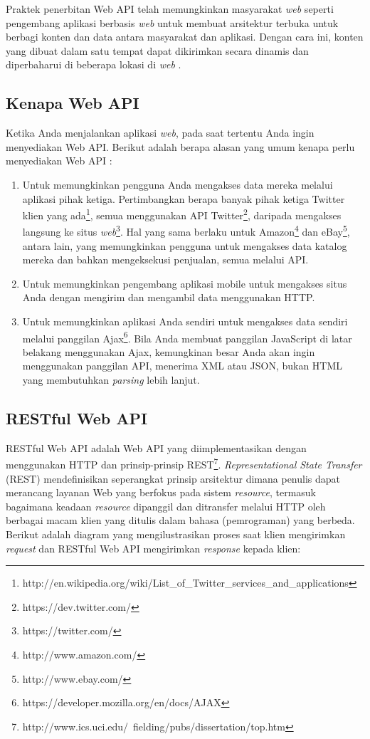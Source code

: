 \documentclass[a4paper, 12pt]{report}
\begin{document}
\onehalfspacing Praktek penerbitan Web API telah memungkinkan masyarakat \textit{web} seperti pengembang aplikasi berbasis \textit{web} untuk membuat arsitektur terbuka untuk berbagi konten dan data antara masyarakat dan aplikasi. Dengan cara ini, konten yang dibuat dalam satu tempat dapat dikirimkan secara dinamis dan diperbaharui di beberapa lokasi di \textit{web} \cite{api-wikipedia}.

\subsection{Kenapa Web API}
Ketika Anda menjalankan aplikasi \textit{web}, pada saat tertentu Anda ingin menyediakan Web API. Berikut adalah berapa alasan yang umum kenapa perlu menyediakan Web API \cite{apis-linux-journal}:

\begin{enumerate}
  \item Untuk memungkinkan pengguna Anda mengakses data mereka melalui aplikasi pihak ketiga. Pertimbangkan berapa banyak pihak ketiga Twitter klien yang ada\footnote{http://en.wikipedia.org/wiki/List\_of\_Twitter\_services\_and\_applications}, semua menggunakan API Twitter\footnote{https://dev.twitter.com/}, daripada mengakses langsung ke situs \textit{web}\footnote{https://twitter.com/}. Hal yang sama berlaku untuk Amazon\footnote{http://www.amazon.com/} dan eBay\footnote{http://www.ebay.com/}, antara lain, yang memungkinkan pengguna untuk mengakses data katalog mereka dan bahkan mengeksekusi penjualan, semua melalui API.
  \item Untuk memungkinkan pengembang aplikasi mobile untuk mengakses situs Anda dengan mengirim dan mengambil data menggunakan HTTP.
  \item Untuk memungkinkan aplikasi Anda sendiri untuk mengakses data sendiri melalui panggilan Ajax\footnote{https://developer.mozilla.org/en/docs/AJAX}. Bila Anda membuat panggilan JavaScript di latar belakang menggunakan Ajax, kemungkinan besar Anda akan ingin menggunakan panggilan API, menerima XML atau JSON, bukan HTML yang membutuhkan \textit{parsing} lebih lanjut.
\end{enumerate}

\subsection{RESTful Web API}

\onehalfspacing RESTful Web API adalah Web API yang diimplementasikan dengan menggunakan HTTP dan prinsip-prinsip REST\footnote{http://www.ics.uci.edu/~fielding/pubs/dissertation/top.htm}. \textit{Representational State Transfer} (REST) mendefinisikan seperangkat prinsip arsitektur dimana penulis dapat merancang layanan Web yang berfokus pada sistem \textit{resource}, termasuk bagaimana keadaan \textit{resource} dipanggil dan ditransfer melalui HTTP oleh berbagai macam klien yang ditulis dalam bahasa (pemrograman) yang berbeda. Berikut adalah diagram yang mengilustrasikan proses saat klien mengirimkan \textit{request} dan RESTful Web API mengirimkan \textit{response} kepada klien:
\end{document}
